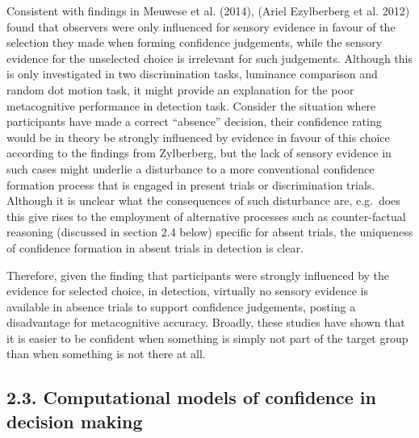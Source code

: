 \documentclass[]{article}
\begin{document}
Consistent with findings in Meuwese et al. (2014), (Ariel Ezylberberg et
al. 2012) found that observers were only influenced for sensory evidence
in favour of the selection they made when forming confidence judgements,
while the sensory evidence for the unselected choice is irrelevant for
such judgements. Although this is only investigated in two
discrimination tasks, luminance comparison and random dot motion task,
it might provide an explanation for the poor metacognitive performance
in detection task. Consider the situation where participants have made a
correct ``absence'' decision, their confidence rating would be in theory
be strongly influenced by evidence in favour of this choice according to
the findings from Zylberberg, but the lack of sensory evidence in such
cases might underlie a disturbance to a more conventional confidence
formation process that is engaged in present trials or discrimination
trials. Although it is unclear what the consequences of such disturbance
are, e.g.~does this give rises to the employment of alternative
processes such as counter-factual reasoning (discussed in section 2.4
below) specific for absent trials, the uniqueness of confidence
formation in absent trials in detection is clear.

Therefore, given the finding that participants were strongly influenced
by the evidence for selected choice, in detection, virtually no sensory
evidence is available in absence trials to support confidence
judgements, posting a disadvantage for metacognitive accuracy. Broadly,
these studies have shown that it is easier to be confident when
something is simply not part of the target group than when something is
not there at all.

\hypertarget{computational-models-of-confidence-in-decision-making}{%
\subsection{2.3. Computational models of confidence in decision
making}\label{computational-models-of-confidence-in-decision-making}}
\end{document}
